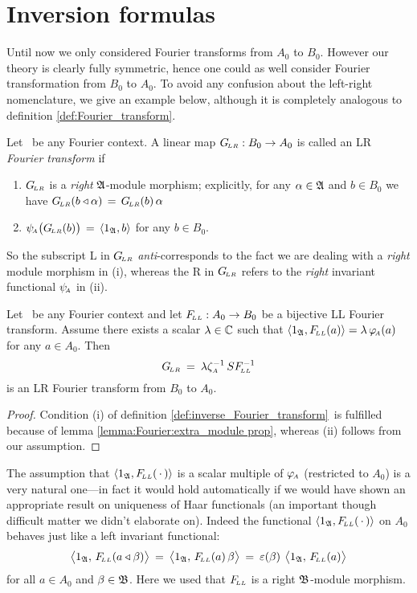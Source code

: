 \section{Inversion formulas}

Until now we only considered Fourier transforms from $A_0$ to $B_0$.
However our theory is clearly fully symmetric, hence one could as well
consider Fourier transformation from $B_0$ to $A_0$.
To avoid any confusion about the left-right nomenclature,
we give an example below, although it is completely analogous to
definition \ref{def:Fourier_transform}.

\begin{defn_sec} \label{def:inverse_Fourier_transform}
Let \FourierBABA\ be any Fourier \mbox{context}\@.
A linear map $G_{\!\scriptscriptstyle LR}:B_0 \rightarrow A_0$ is called an {\scriptsize LR}
{\em Fourier transform\/} if
\begin{enumerate}
\item
$G_{\!\scriptscriptstyle LR}$ is a {\em right\/} $\mathfrak A$-module morphism;
explicitly, for any $\alpha \in {\mathfrak A}$ and $b\in B_0$ we have
$G_{\!\scriptscriptstyle LR}(b \triangleleft \alpha) \,=\, G_{\!\scriptscriptstyle LR}(b)\, \alpha$
\item
$\psiA\! \left(\GLR(b)\vertM\right) \,=\, \pair{1_{\frakA}}{b}$ for any $b\in B_0$.
\end{enumerate}
So the subscript {\scriptsize L} in $G_{\!\scriptscriptstyle LR}$ {\em anti\/}-corresponds to the fact
we are dealing with a {\em right\/} module morphism in (i),
whereas the {\scriptsize R} in $G_{\!\scriptscriptstyle LR}$ refers to the {\em right\/}
invariant functional $\psi_{\!\scriptscriptstyle A}$ in (ii).
\end{defn_sec}


\begin{prop_sec} \label{prop:inverse_Fourier_transform}
Let \FourierBABA\ be any Fourier context and
let\/ $F_{\!\scriptscriptstyle LL}: A_0 \rightarrow B_0$ be a bijective {\scriptsize LL} Fourier transform.
Assume there exists a scalar\/ $\lambda\in \mathbb{C}$ such that\/
$\langle 1_{\mathfrak A},F_{\!\scriptscriptstyle LL}(a) \rangle = \lambda \,\varphi_{\!\scriptscriptstyle A}(a)$ for any\/ $a\in A_0$.
Then
$$ G_{\!\scriptscriptstyle LR} \:=\: \lambda \zeta_{\scriptscriptstyle A}^{-1} \, S F_{\!\scriptscriptstyle LL}^{-1} $$
is an {\scriptsize LR} Fourier transform from\/ $B_0$ to $A_0$.
\end{prop_sec}
\begin{proof}
Condition (i) of definition \ref{def:inverse_Fourier_transform}\ is
fulfilled because of lemma \ref{lemma:Fourier:extra_module prop},
whereas (ii) follows from our assumption.
\end{proof}


\begin{remark_sec} \rm
The assumption that $\langle 1_{\mathfrak A},F_{\!\scriptscriptstyle LL}(\,\cdot \,) \rangle$
is a scalar multiple of $\varphi_{\!\scriptscriptstyle A}$ (restricted to $A_0$)
is a very natural one---in fact it would hold automatically if we
would have shown an appropriate result on uniqueness of Haar functionals
(an important though difficult matter we didn't elaborate on).
Indeed the functional $\langle 1_{\mathfrak A},F_{\!\scriptscriptstyle LL}(\,\cdot \,) \rangle$ on $A_0$
behaves just like a left invariant functional:
$$  \pairM{1_{\frakA}}{\FLL(a \ract \beta)}
      \:=\: \pairM{1_{\frakA}}{\FLL(a)\, \beta}
      \:=\: \eps(\beta) \: \pairM{1_{\frakA}}{\FLL(a)}  $$
for all $a \in A_0$ and $\beta\in {\mathfrak B}$.
Here we used that $F_{\!\scriptscriptstyle LL}$ is a right $\mathfrak B$-module morphism.
\end{remark_sec}
